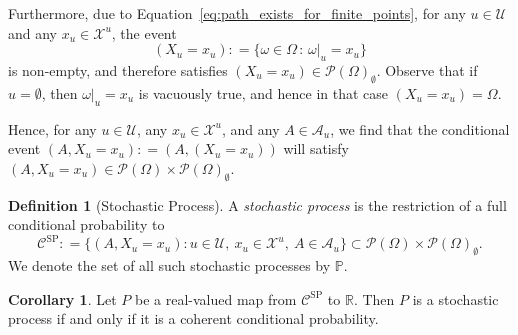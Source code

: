 \documentclass[10pt,a4paper]{paper}
\theoremstyle{definition}
\newtheorem{corollary}[theorem]{Corollary}
\newtheorem{definition}{Definition}
\newcommand{\reals}{\mathbb{R}}
\newcommand{\states}{\mathcal{X}}
\newcommand{\paths}{\Omega}
\newcommand{\power}{\mathcal{P}(\paths)}
\newcommand{\nonemptypower}{\power_{\emptyset}}
\newcommand{\processes}{\mathbb{P}}
\newcommand{\coloneqq}{:\!=}
\begin{document}
Furthermore, due to Equation~\eqref{eq:path_exists_for_finite_points}, for any $u\in\mathcal{U}$ and any $x_u\in\states^u$, the event
\begin{equation*}
(X_u=x_u) \coloneqq \{\omega\in\Omega\,:\,\omega\vert_u=x_u\}
\end{equation*}
is non-empty, and therefore satisfies $(X_u=x_u)\in\nonemptypower$. Observe that if $u=\emptyset$, then $\omega\vert_u=x_u$ is vacuously true, and hence in that case $(X_u=x_u)=\Omega$.

Hence, for any $u\in\mathcal{U}$, any $x_u\in\states^u$, and any $A\in\mathcal{A}_u$, we find that the conditional event $(A,X_u=x_u)\coloneqq (A,(X_u=x_u))$ will satisfy $(A,X_u=x_u)\in\power\times\nonemptypower$.

\begin{definition}[Stochastic Process]\label{def:stoch_process}
A \emph{stochastic process} is the restriction of a full conditional probability to
\begin{equation*}
\mathcal{C}^\mathrm{SP}\coloneqq\big\{
(A,X_u=x_u)
\colon
u\in\mathcal{U},~x_u\in\states^u,~A\in\mathcal{A}_u\big\}\subset\power\times\nonemptypower.
\end{equation*}
We denote the set of all such stochastic processes by $\processes$.
\end{definition}

\begin{corollary}\label{corol:processiffcoherent}
Let $P$ be a real-valued map from $\mathcal{C}^\mathrm{SP}$ to $\reals$. Then $P$ is a stochastic process if and only if it is a coherent conditional probability.
\end{corollary}
\end{document}
